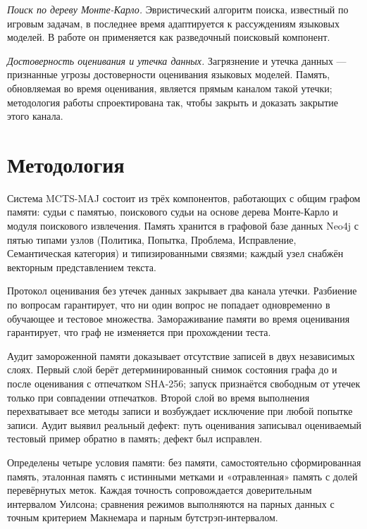 \documentclass[14pt,a4paper]{extreport}
\begin{document}
\emph{Поиск по дереву Монте-Карло.} Эвристический алгоритм поиска, известный по игровым задачам, в последнее время адаптируется к рассуждениям языковых моделей. В работе он применяется как разведочный поисковый компонент.

\emph{Достоверность оценивания и утечка данных.} Загрязнение и утечка данных — признанные угрозы достоверности оценивания языковых моделей. Память, обновляемая во время оценивания, является прямым каналом такой утечки; методология работы спроектирована так, чтобы закрыть и доказать закрытие этого канала.

\chapter{Методология}

Система MCTS-MAJ состоит из трёх компонентов, работающих с общим графом памяти: судьи с памятью, поискового судьи на основе дерева Монте-Карло и модуля поискового извлечения. Память хранится в графовой базе данных Neo4j с пятью типами узлов (Политика, Попытка, Проблема, Исправление, Семантическая категория) и типизированными связями; каждый узел снабжён векторным представлением текста.

Протокол оценивания без утечек данных закрывает два канала утечки. Разбиение по вопросам гарантирует, что ни один вопрос не попадает одновременно в обучающее и тестовое множества. Замораживание памяти во время оценивания гарантирует, что граф не изменяется при прохождении теста.

Аудит замороженной памяти доказывает отсутствие записей в двух независимых слоях. Первый слой берёт детерминированный снимок состояния графа до и после оценивания с отпечатком SHA-256; запуск признаётся свободным от утечек только при совпадении отпечатков. Второй слой во время выполнения перехватывает все методы записи и возбуждает исключение при любой попытке записи. Аудит выявил реальный дефект: путь оценивания записывал оцениваемый тестовый пример обратно в память; дефект был исправлен.

Определены четыре условия памяти: без памяти, самостоятельно сформированная память, эталонная память с истинными метками и «отравленная» память с долей перевёрнутых меток. Каждая точность сопровождается доверительным интервалом Уилсона; сравнения режимов выполняются на парных данных с точным критерием Макнемара и парным бутстрэп-интервалом.

\end{document}
